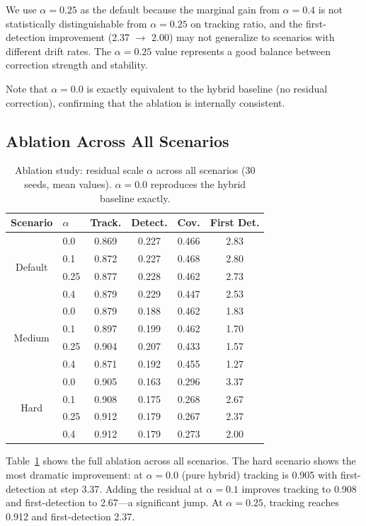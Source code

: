 \documentclass[journal]{IEEEtran}
\begin{document}
We use $\alpha = 0.25$ as the default because the marginal gain from $\alpha = 0.4$
is not statistically distinguishable from $\alpha = 0.25$ on tracking ratio, and the
first-detection improvement (2.37 $\to$ 2.00) may not generalize to scenarios with
different drift rates. The $\alpha = 0.25$ value represents a good balance between
correction strength and stability.

Note that $\alpha = 0.0$ is exactly equivalent to the hybrid baseline (no residual
correction), confirming that the ablation is internally consistent.

\subsection{Ablation Across All Scenarios}
\label{sec:ablation_all}

\begin{table}[t]
\centering
\caption{Ablation study: residual scale $\alpha$ across all scenarios (30 seeds, mean values).
$\alpha=0.0$ reproduces the hybrid baseline exactly.}
\label{tab:ablation_all}
\small
\begin{tabular}{@{}clcccc@{}}
\toprule
Scenario & $\alpha$ & Track. & Detect. & Cov. & First Det. \\
\midrule
\multirow{4}{*}{Default}
  & 0.0  & 0.869 & 0.227 & 0.466 & 2.83 \\
  & 0.1  & 0.872 & 0.227 & 0.468 & 2.80 \\
  & 0.25 & 0.877 & 0.228 & 0.462 & 2.73 \\
  & 0.4  & 0.879 & 0.229 & 0.447 & 2.53 \\
\midrule
\multirow{4}{*}{Medium}
  & 0.0  & 0.879 & 0.188 & 0.462 & 1.83 \\
  & 0.1  & 0.897 & 0.199 & 0.462 & 1.70 \\
  & 0.25 & 0.904 & 0.207 & 0.433 & 1.57 \\
  & 0.4  & 0.871 & 0.192 & 0.455 & 1.27 \\
\midrule
\multirow{4}{*}{Hard}
  & 0.0  & 0.905 & 0.163 & 0.296 & 3.37 \\
  & 0.1  & 0.908 & 0.175 & 0.268 & 2.67 \\
  & 0.25 & 0.912 & 0.179 & 0.267 & 2.37 \\
  & 0.4  & 0.912 & 0.179 & 0.273 & 2.00 \\
\bottomrule
\end{tabular}
\end{table}

Table~\ref{tab:ablation_all} shows the full ablation across all scenarios. The hard
scenario shows the most dramatic improvement: at $\alpha = 0.0$ (pure hybrid) tracking
is 0.905 with first-detection at step 3.37. Adding the residual at $\alpha = 0.1$
improves tracking to 0.908 and first-detection to 2.67---a significant jump. At
$\alpha = 0.25$, tracking reaches 0.912 and first-detection 2.37.
\end{document}

